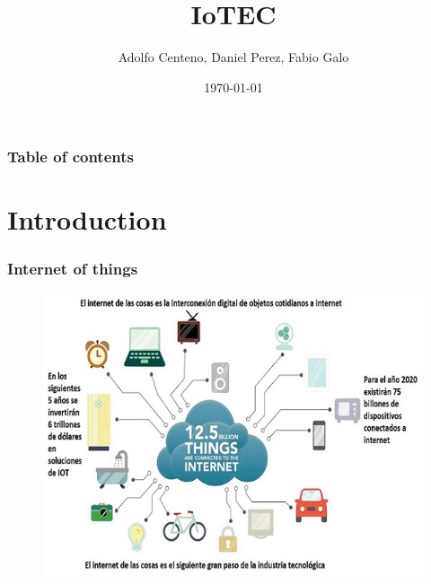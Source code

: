 \documentclass{beamer}
\begin{document}
\title{IoTEC}  
\author{Adolfo Centeno, Daniel Perez, Fabio Galo}
\date{\today} 

\begin{frame}
\titlepage
\end{frame}

\begin{frame}\frametitle{Table of contents}\tableofcontents
\end{frame} 


\section{Introduction} 

\begin{frame}\frametitle{Internet of things} 


\begin{figure}
\includegraphics[scale=0.9]{iot} 
\end{figure}




\end{frame}
\end{document}
